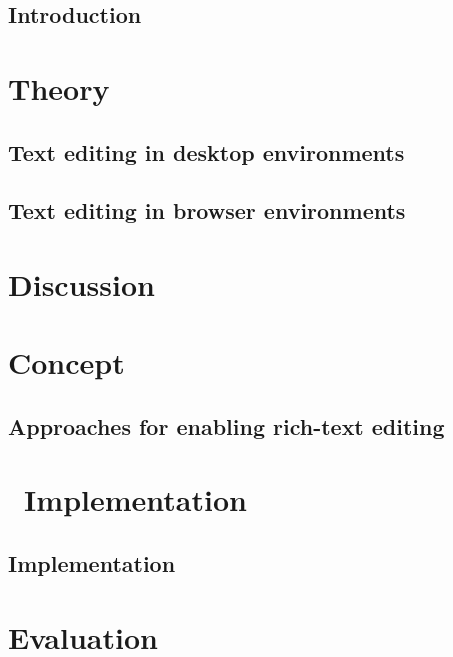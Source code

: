 \chapter{Introduction}



\part{Theory}
\label{part:theory}

\chapter{Text editing in desktop environments}
\label{ch:desktop}



\chapter{Text editing in browser environments}
\label{ch:browser}






\part{Discussion}
\label{part:discussion}
















\part{Concept}
\label{part-concept}

\chapter{Approaches for enabling rich-text editing}
\label{ch:approaches}



\part{\ Implementation}
\label{part:implementation}

\chapter{Implementation}
\label{ch:impl}



\part{Evaluation}
\label{part:evaluation}

